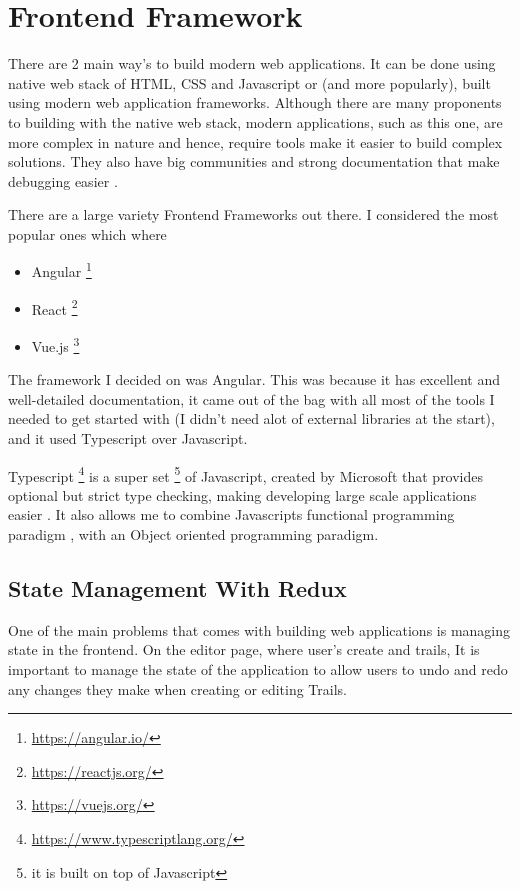 \section{Frontend Framework} \label{frontendFramework}
There are 2 main way's to build modern web applications. It can be done using native web stack of HTML, CSS and Javascript or (and more popularly), built using modern web application frameworks. Although there are many proponents to building with the native web stack, modern applications, such as this one, are more complex in nature and hence, require tools make it easier to build complex solutions. They also have big communities and strong documentation that make debugging easier \cite{medium:WhyModernJSFrameworkExist}.

There are a large variety Frontend Frameworks out there. I considered the most popular ones which where
\begin{itemize}
    \item Angular \footnote{\url{https://angular.io/}}
    \item React \footnote{\url{https://reactjs.org/}}
    \item Vue.js \footnote{\url{https://vuejs.org/}}
\end{itemize}

The framework I decided on was Angular. This was because it has excellent and well-detailed documentation, it came out of the bag with all most of the tools I needed to get started with (I didn't need alot of external libraries at the start), and it used Typescript over Javascript.

Typescript \footnote{\url{https://www.typescriptlang.org/}} is a super set \footnote{it is built on top of Javascript} of Javascript, created by Microsoft that provides optional but strict type checking, making developing large scale applications easier \cite{bierman2014understanding}. It also allows me to combine Javascripts functional programming paradigm \cite{hughes1989functional}, with an Object oriented programming paradigm.

\subsection{State Management With Redux}
One of the main problems that comes with building web applications is managing state in the frontend. On the editor page, where user's create and trails, It is important to manage the state of the application to allow users to undo and redo any changes they make when creating or editing Trails.


